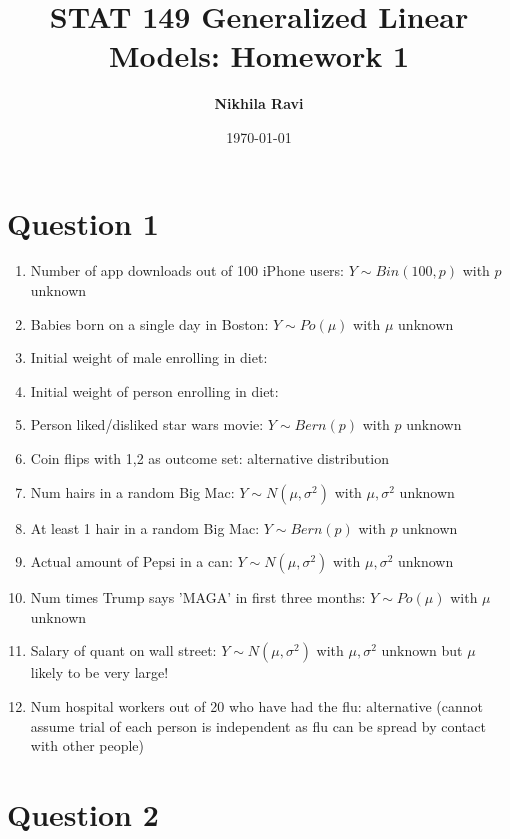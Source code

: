 \documentclass[11pt]{article}
\title{
\vspace{1cm}
\textmd{\textbf{STAT 149 Generalized Linear Models: Homework 1}}\\
}
\author{\textbf{Nikhila Ravi}}
\date{\today} %
\begin{document}

\maketitle

\lstset{language=Python, basicstyle=\footnotesize} %

\section*{Question 1}
\begin{enumerate}[label=(\alph*)]
\item Number of app downloads out of 100 iPhone users: $Y \sim Bin(100, p)$ with $p$ unknown 
\item Babies born on a single day in Boston: $Y \sim Po(\mu)$ with $\mu$ unknown 
\item Initial weight of male enrolling in diet: 
\item Initial weight of person enrolling in diet: 
\item Person liked/disliked star wars movie:  $Y \sim Bern(p)$ with $p$ unknown 
\item Coin flips with {1,2} as outcome set: alternative distribution
\item Num hairs in a random Big Mac: $Y \sim N(\mu, \sigma^2)$ with $\mu, \sigma^2$ unknown 
\item At least 1 hair in a random Big Mac: $Y \sim Bern(p)$ with $p$ unknown 
\item Actual amount of Pepsi in a can: $Y \sim N(\mu, \sigma^2)$ with $\mu, \sigma^2$ unknown
\item Num times Trump says 'MAGA' in first three months: $Y \sim Po(\mu)$ with $\mu$ unknown 
\item Salary of quant on wall street: $Y \sim N(\mu, \sigma^2)$ with $\mu, \sigma^2$ unknown but $\mu$ likely to be very large!
\item Num hospital workers out of 20 who have had the flu: alternative (cannot assume trial of each person is independent as flu can be spread by contact with other people)
\end{enumerate}

\section*{Question 2}
\end{document}
